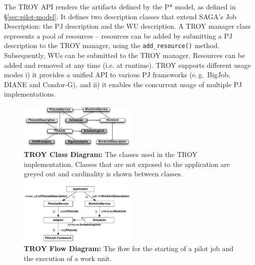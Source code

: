 \documentclass[conference,final]{IEEEtran}
\begin{document}
The TROY API renders the artifacts defined by the P* model, as defined in
\S\ref{sec:pilot-model}. It defines two description classes that extend SAGA's
Job Description: the PJ description and the WU description. A TROY manager class
represents a pool of resources -- resources can be added by submitting a PJ
description to the TROY manager, using the \texttt{add\_resource()} method.
Subsequently, WUs can be submitted to the TROY manager. Resources can be added
and removed at any time (i.e. at runtime). TROY supports different usage modes
i) it provides a unified API to various PJ frameworks (e.\,g.\ BigJob,
DIANE and Condor-G), and ii) it enables the concurrent usage of multiple PJ
implementations. 

\begin{figure}[t]
	\centering
		\includegraphics[width=0.51\textwidth]{figures/troy_classes.pdf}
	\caption{\textbf{TROY Class Diagram:} The classes used in the TROY implementation. Classes that are not exposed to the application are greyed out and cardinality is shown between classes. 
	}
	\label{fig:figures_troy_classes}
\end{figure}

\begin{figure}[t]
	\centering
		\includegraphics[width=0.51\textwidth]{figures/troy_flow.pdf}
	\caption{\textbf{TROY Flow Diagram:} The flow for the starting of a pilot job and the execution of a work unit.
	}
	\label{fig:figures_troy_flow}
\end{figure}
\end{document}
